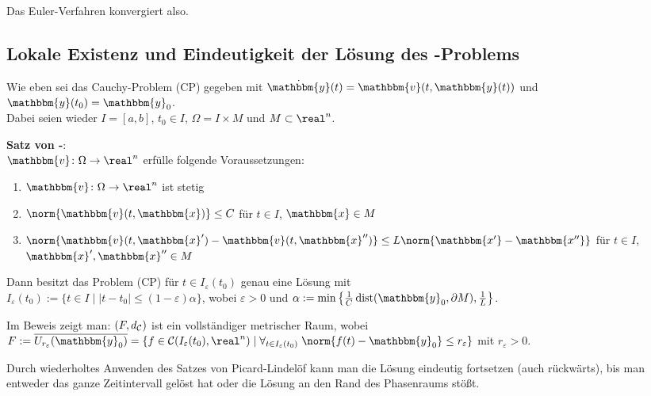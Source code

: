 Das Euler-Verfahren konvergiert also.

\subsection{%
    Lokale Existenz und Eindeutigkeit der Lösung des -Problems%
}

Wie eben sei das Cauchy-Problem (CP) gegeben mit
$\dot{\mathbbm{y}}(t) = \mathbbm{v}(t, \mathbbm{y}(t))$ und
$\mathbbm{y}(t_0) = \mathbbm{y}_0$. \\
Dabei seien wieder $I = [a, b]$, $t_0 \in I$, $\Omega = I \times M$ und
$M \subset \real^n$.

\textbf{Satz von -}: \\
$\mathbbm{v}\colon \Omega \rightarrow \real^n$ erfülle folgende
Voraussetzungen:
\begin{enumerate}
    \item
    $\mathbbm{v}\colon \Omega \rightarrow \real^n$ ist stetig

    \item
    $\norm{\mathbbm{v}(t, \mathbbm{x})} \le C$ für
    $t \in I$, $\mathbbm{x} \in M$

    \item
    $\norm{\mathbbm{v}(t, \mathbbm{x}') - \mathbbm{v}(t, \mathbbm{x}'')} \le
    L \norm{\mathbbm{x'} - \mathbbm{x''}}$ für
    $t \in I$, $\mathbbm{x}', \mathbbm{x}'' \in M$
\end{enumerate}
Dann besitzt das Problem (CP) für $t \in I_\varepsilon(t_0)$
genau eine Lösung mit \\
$I_\varepsilon(t_0) := \{t \in I \;|\;
|t - t_0| \le (1 - \varepsilon) \alpha\}$, wobei $\varepsilon > 0$ und
$\alpha := \min\left\{\frac{1}{C} \dist(\mathbbm{y}_0, \partial M),
\frac{1}{L}\right\}$.

Im Beweis zeigt man:
$(F, d_{\mathcal{C}})$ ist ein vollständiger metrischer Raum, wobei \\
$F := \overline{U_{r_\varepsilon}(\mathbbm{y}_0)} =
\{f \in \C(I_\varepsilon(t_0), \real^n) \;|\;
\forall_{t \in I_\varepsilon(t_0)}\;
\norm{f(t) - \mathbbm{y}_0} \le r_\varepsilon\}$ mit $r_\varepsilon > 0$.

\linie

Durch wiederholtes Anwenden des Satzes von Picard-Lindelöf kann man die Lösung
eindeutig fortsetzen (auch rückwärts), bis man entweder das ganze Zeitintervall
gelöst hat oder die Lösung an den Rand des Phasenraums stößt.

